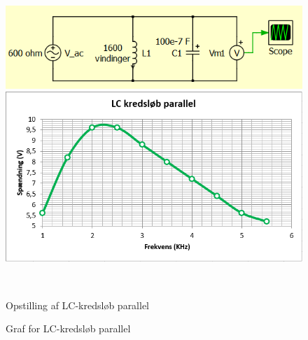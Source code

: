 \begin{figure}[H]
	\centering
	\begin{minipage}[b]{0.48\textwidth}
	\centering
	\includegraphics[width=1\textwidth]{Vildledning/Schematics/kredslb/LC_Parallel} %
	\end{minipage}
	\hfill
	\begin{minipage}[b]{0.48\textwidth}
	\centering
	\includegraphics[width=1\textwidth]{Setup/Graf5} %
	\end{minipage}
	\\ %
	\begin{minipage}[t]{0.48\textwidth}
	\caption{Opstilling af LC-kredsløb parallel} %
	\end{minipage}
	\hfill
	\begin{minipage}[t]{0.48\textwidth}
	\caption{Graf for LC-kredsløb parallel} %
	\end{minipage}
\end{figure}